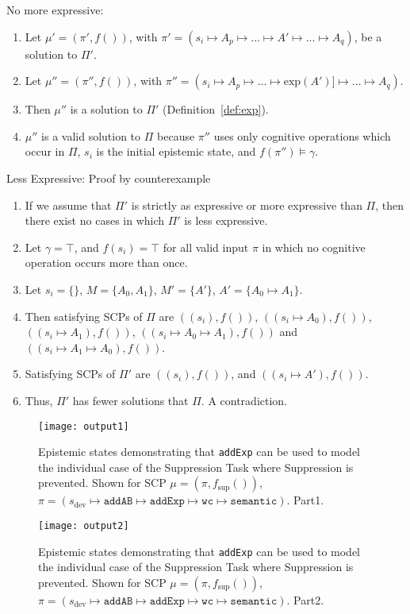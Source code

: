 \begin{bulletProof} \label{proof:aggregateExpressiveness}
\item No more expressive:
\begin{enumerate}
\item Let $\mu'=(\pi',f())$, with $\pi' = (s_i\longmapsto A_p \longmapsto ... \longmapsto A' \longmapsto ... \longmapsto A_q)$, be a solution to $\Pi'$.
\item Let $\mu''=(\pi'',f())$, with $\pi'' = (s_i\longmapsto A_p \longmapsto ... \longmapsto \text{exp}(A')] \longmapsto ... \longmapsto A_q)$.
\item Then $\mu''$ is a solution to $\Pi'$ (Definition~\ref{def:exp}).
\item $\mu''$ is a valid solution to $\Pi$ because $\pi''$ uses only cognitive operations which occur in $\Pi$, $s_i$ is the initial epistemic state, and $f(\pi'') \models \gamma$. 
\end{enumerate}
\item Less Expressive: Proof by counterexample
\begin{enumerate}
\item If we assume that $\Pi'$ is strictly as expressive or more expressive than $\Pi$, then there exist no cases in which $\Pi'$ is less expressive.
\item Let $\gamma = \top$, and $f(s_i)=\top$ for all valid input $\pi$ in which no cognitive operation occurs more than once.
\item Let $s_i=\{\}$, $M=\{A_0,A_1\}$, $M'=\{A'\}$, $A'=\{A_0\longmapsto A_1\}$.
\item Then satisfying SCPs of $\Pi$ are $((s_i),f())$, $((s_i \longmapsto A_0),f())$, $((s_i \longmapsto A_1),f())$, $((s_i \longmapsto A_0\longmapsto A_1),f())$ and $((s_i \longmapsto A_1\longmapsto A_0),f())$.
\item Satisfying SCPs of $\Pi'$ are $((s_i),f())$, and $((s_i \longmapsto A'),f())$.
\item Thus, $\Pi'$ has fewer solutions that $\Pi$. A contradiction.
\end{enumerate}
\end{bulletProof}


\begin{figure}
\centering \texttt{[image: output1]}
\caption{Epistemic states demonstrating that \texttt{addExp} can be used to model the individual case of the Suppression Task where Suppression is prevented. Shown for SCP $\mu=(\pi,f_\text{sup}())$, $\pi = (s_\text{dev} \longmapsto \texttt{addAB} \longmapsto \texttt{addExp} \longmapsto \texttt{wc} \longmapsto \texttt{semantic} )$. Part1.}
\label{fig:suppression_python}
\end{figure}
\begin{figure}
\centering \texttt{[image: output2]}
\caption{Epistemic states demonstrating that \texttt{addExp} can be used to model the individual case of the Suppression Task where Suppression is prevented. Shown for SCP $\mu=(\pi,f_\text{sup}())$, $\pi = (s_\text{dev} \longmapsto \texttt{addAB} \longmapsto \texttt{addExp} \longmapsto \texttt{wc} \longmapsto \texttt{semantic} )$. Part2.}
\label{fig:suppression_python2}
\end{figure}

